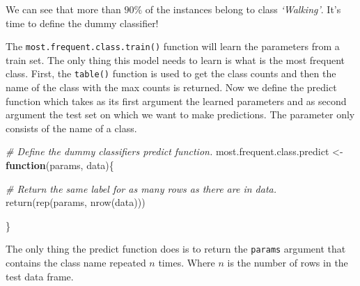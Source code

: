 \documentclass[
  11pt,
]{krantz}
\newenvironment{Shaded}{\begin{snugshade}}{\end{snugshade}}
\newcommand{\CommentTok}[1]{\textcolor[rgb]{0.37,0.37,0.37}{\textit{#1}}}
\newcommand{\ControlFlowTok}[1]{\textcolor[rgb]{0.27,0.27,0.27}{\textbf{#1}}}
\newcommand{\FunctionTok}[1]{\textcolor[rgb]{0,0,0}{#1}}
\newcommand{\NormalTok}[1]{#1}
\newcommand{\OtherTok}[1]{\textcolor[rgb]{0.37,0.37,0.37}{#1}}
\newcommand{\SpecialCharTok}[1]{\textcolor[rgb]{0,0,0}{#1}}
\begin{document}
We can see that more than \(90\%\) of the instances belong to class \emph{`Walking'}. It's time to define the dummy classifier!

\begin{Shaded}
\end{Shaded}

The \texttt{most.frequent.class.train()} function will learn the parameters from a train set. The only thing this model needs to learn is what is the most frequent class. First, the \texttt{table()} function is used to get the class counts and then the name of the class with the max counts is returned. Now we define the predict function which takes as its first argument the learned parameters and as second argument the test set on which we want to make predictions. The parameter only consists of the name of a class.

\begin{Shaded}
\begin{Highlighting}[]
\CommentTok{\# Define the dummy classifier\textquotesingle{}s predict function.}
\NormalTok{most.frequent.class.predict }\OtherTok{\textless{}{-}} \ControlFlowTok{function}\NormalTok{(params, data)\{}

  \CommentTok{\# Return the same label for as many rows as there are in data.}
  \FunctionTok{return}\NormalTok{(}\FunctionTok{rep}\NormalTok{(params, }\FunctionTok{nrow}\NormalTok{(data)))}
  
\NormalTok{\}}
\end{Highlighting}
\end{Shaded}

The only thing the predict function does is to return the \texttt{params} argument that contains the class name repeated \(n\) times. Where \(n\) is the number of rows in the test data frame.
\end{document}
